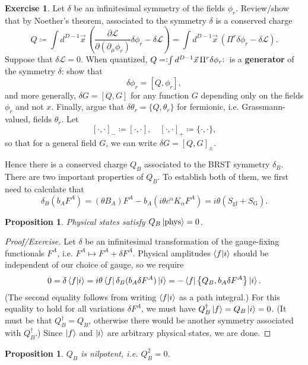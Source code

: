 \documentclass{report}
\theoremstyle{plain}
\newtheorem{proposition}[theorem]{Proposition}
\theoremstyle{definition}
\newtheorem{exercise}{Exercise}[section]
\theoremstyle{remark}
\newcommand{\di}{\partial}
\newcommand{\NO}[1]{\vcentcolon\mathrel{#1}\vcentcolon\,}
\newcommand{\cL}{\mathcal{L}}
\newcommand{\pder}[2]{\frac{\partial #1}{\partial #2}}
\begin{document}
\begin{exercise}
  Let $\delta$ be an infinitesimal symmetry of the fields $\phi_r$.
  Review/show that by Noether's theorem, associated to the symmetry
  $\delta$ is a conserved charge
  \[ Q \coloneqq \int d^{D-1}\vec{x} \, \left(\pder{\cL}{(\di_\mu \phi_r)} \delta \phi_r - \delta \cL\right) = \int d^{D-1}\vec{x} \, \left(\Pi^r \delta \phi_r - \delta \cL\right). \]
  Suppose that $\delta \cL = 0$. When quantized, $Q = \NO{\int
    d^{D-1}\vec{x}\, \Pi^r \delta \phi_r}$ is a {\bf generator} of the
  symmetry $\delta$: show that
  \[ \delta \phi_r = [Q, \phi_r], \]
  and more generally, $\delta G = [Q, G]$ for any function $G$
  depending only on the fields $\phi_r$ and not $x$. Finally, argue
  that $\delta \theta_r = \{Q, \theta_r\}$ for fermionic, i.e.
  Grassmann-valued, fields $\theta_r$. Let
  \[ [\cdot, \cdot]_- \coloneqq [\cdot, \cdot], \quad [\cdot, \cdot]_+ \coloneqq \{\cdot, \cdot\}, \]
  so that for a general field $G$, we can write $\delta G = [Q,
    G]_{\pm}$.
\end{exercise}

Hence there is a conserved charge $Q_B$ associated to the BRST
symmetry $\delta_B$. There are two important properties of $Q_B$. To
establish both of them, we first need to calculate that
\[ \delta_B(b_A F^A) = (\theta B_A) F^A - b_A (i\theta c^\alpha K_\alpha F^A) = i\theta (S_{\text{gf}} + S_{\text{G}}). \]

\begin{proposition}
  Physical states satisfy $Q_B\ket{\mathrm{phys}} = 0$.
\end{proposition}

\begin{proof}[Proof/Exercise]
  Let $\delta$ be an infinitesimal transformation of the gauge-fixing
  functionals $F^A$, i.e. $F^A \mapsto F^A + \delta F^A$. Physical
  amplitudes $\braket{f|i}$ should be independent of our choice of
  gauge, so we require
  \[ 0 = \delta \braket{f|i} = i\theta \bra{f}\delta_B(b_A \delta F^A)\ket{i} = -\bra{f}\left\{Q_B, b_A \delta F^A\right\}\ket{i}. \]
  (The second equality follows from writing $\braket{f|i}$ as a path
  integral.) For this equality to hold for all variations $\delta
  F^A$, we must have $Q_B^\dag\ket{f} = Q_B\ket{i} = 0$. (It must be
  that $Q_B^\dag = Q_B$, otherwise there would be another symmetry
  associated with $Q_B^\dag$.) Since $\ket{f}$ and $\ket{i}$ are
  arbitrary physical states, we are done.
\end{proof}

\begin{proposition}
  $Q_B$ is nilpotent, i.e. $Q_B^2 = 0$.
\end{proposition}
\end{document}
